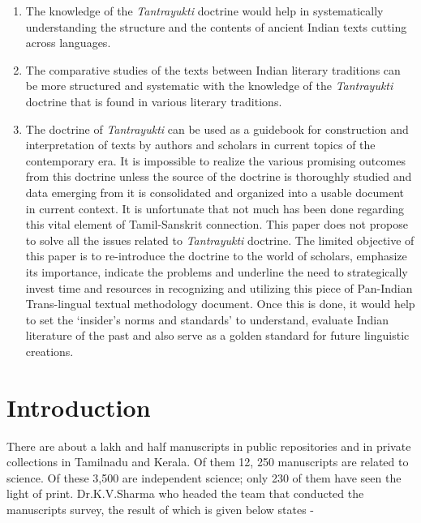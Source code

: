 \begin{enumerate}[{\rm a)}]
\itemsep=0pt
\item The knowledge of the \textit{Tantrayukti} doctrine would help in systematically understanding the structure and the contents of ancient Indian texts cutting across languages.

 \item The comparative studies of the texts between Indian literary traditions can be more structured and systematic with the knowledge of the \textit{Tantrayukti} doctrine that is found in various literary traditions.
 
 \item The doctrine of \textit{Tantrayukti} can be used as a guidebook for construction and interpretation of texts by authors and scholars in current topics of the contemporary era. It is impossible to realize the various promising outcomes from this doctrine unless the source of the doctrine is thoroughly studied and data emerging from it is consolidated and organized into a usable document in current context. It is unfortunate that not much has been done regarding this vital element of Tamil-Sanskrit connection. This paper does not propose to solve all the issues related to \textit{Tantrayukti} doctrine. The limited objective of this paper is to re-introduce the doctrine to the world of scholars, emphasize its importance, indicate the problems and underline the need to strategically invest time and resources in recognizing and utilizing this piece of Pan-Indian Trans-lingual textual methodology document. Once this is done, it would help to set the ‘insider’s norms and standards’ to understand, evaluate Indian literature of the past and also serve as a golden standard for future linguistic creations.

\end{enumerate}


\section*{Introduction}

There are about a lakh and half manuscripts in public repositories and in private collections in Tamilnadu and Kerala. Of them 12, 250 manuscripts are related to science. Of these 3,500 are independent science; only 230 of them have seen the light of print. Dr.K.V.Sharma who headed the team that conducted the manuscripts survey, the result of which is given below states -

